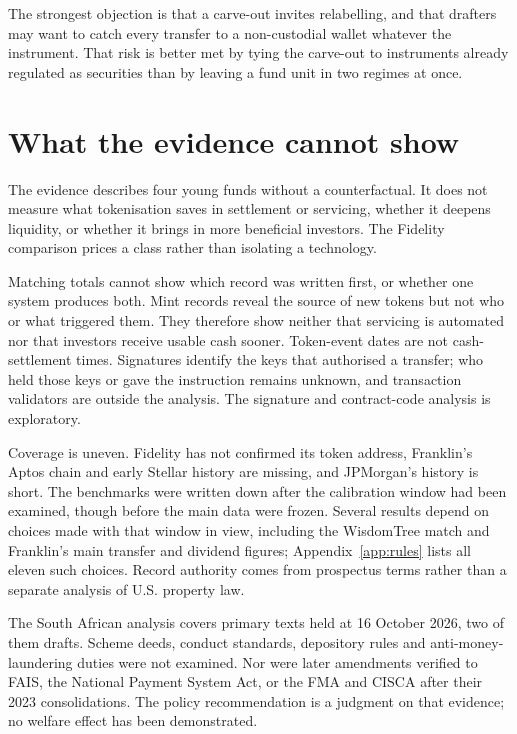 \documentclass[12pt,a4paper]{article}
\begin{document}
The strongest objection is that a carve-out invites relabelling, and that drafters may want to catch every transfer to a non-custodial wallet whatever the instrument. That risk is better met by tying the carve-out to instruments already regulated as securities than by leaving a fund unit in two regimes at once.

\section{What the evidence cannot show}\label{sec:limits}
The evidence describes four young funds without a counterfactual. It does not measure what tokenisation saves in settlement or servicing, whether it deepens liquidity, or whether it brings in more beneficial investors. The Fidelity comparison prices a class rather than isolating a technology.

Matching totals cannot show which record was written first, or whether one system produces both. Mint records reveal the source of new tokens but not who or what triggered them. They therefore show neither that servicing is automated nor that investors receive usable cash sooner. Token-event dates are not cash-settlement times. Signatures identify the keys that authorised a transfer; who held those keys or gave the instruction remains unknown, and transaction validators are outside the analysis. The signature and contract-code analysis is exploratory.

Coverage is uneven. Fidelity has not confirmed its token address, Franklin's Aptos chain and early Stellar history are missing, and JPMorgan's history is short. The benchmarks were written down after the calibration window had been examined, though before the main data were frozen. Several results depend on choices made with that window in view, including the WisdomTree match and Franklin's main transfer and dividend figures; Appendix~\ref{app:rules} lists all eleven such choices. Record authority comes from prospectus terms rather than a separate analysis of U.S. property law.

The South African analysis covers primary texts held at 16 October 2026, two of them drafts. Scheme deeds, conduct standards, depository rules and anti-money-laundering duties were not examined. Nor were later amendments verified to FAIS, the National Payment System Act, or the FMA and CISCA after their 2023 consolidations. The policy recommendation is a judgment on that evidence; no welfare effect has been demonstrated.
\end{document}
